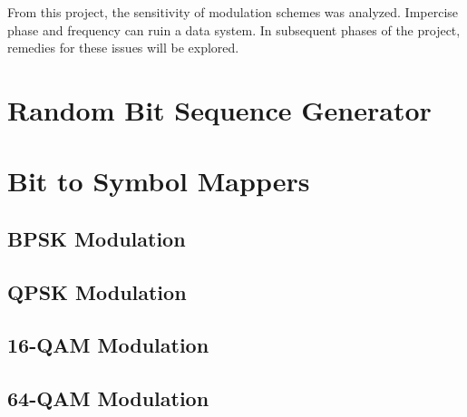 \documentclass[]{article}
\begin{document}
From this project, the sensitivity of modulation schemes was analyzed.  Impercise phase and frequency can ruin a data system.  In subsequent phases of the project, remedies for these issues will be explored.

\appendix
\newpage


\newpage
%


\section{Random Bit Sequence Generator}
\label{app:random_bit_generator}


\section{Bit to Symbol Mappers}
\label{app:bittosym}
\subsection{BPSK Modulation }
\label{app:bpsk_mod}
%



\subsection{QPSK Modulation}
\label{app:qpsk_mod}


\subsection{16-QAM Modulation}
\label{app:qam_16_mod}



\subsection{64-QAM Modulation }
\label{app:qam_64_mod}

\end{document}
